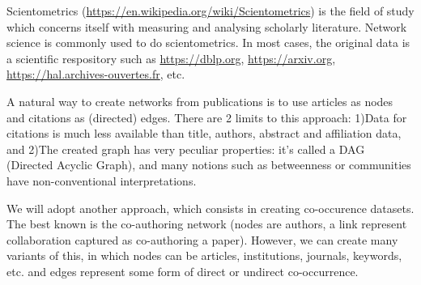 \documentclass[addpoints]{exam}
\begin{document}
\begin{center}
\end{center}



\begin{tcolorbox}[colback=black!5!white,colframe=white!75!black]
Scientometrics (\url{https://en.wikipedia.org/wiki/Scientometrics}) is the field of study which concerns itself with measuring and analysing scholarly literature. Network science is commonly used to do scientometrics. In most cases, the original data is a scientific respository such as \url{https://dblp.org}, \url{https://arxiv.org}, \url{https://hal.archives-ouvertes.fr}, etc.

A natural way to create networks from publications is to use articles as nodes and citations as (directed) edges. There are 2 limits to this approach: 1)Data for citations is much less available than title, authors, abstract and affiliation data, and 2)The created graph has very peculiar properties: it's called a DAG (Directed Acyclic Graph), and many notions such as betweenness or communities have non-conventional interpretations. 

We will adopt another approach, which consists in creating co-occurence datasets. The best known is the co-authoring network (nodes are authors, a link represent collaboration captured as co-authoring a paper). However, we can create many variants of this, in which nodes can be articles, institutions, journals, keywords, etc. and edges represent some form of direct or undirect co-occurrence.


\end{tcolorbox}
\end{document}
